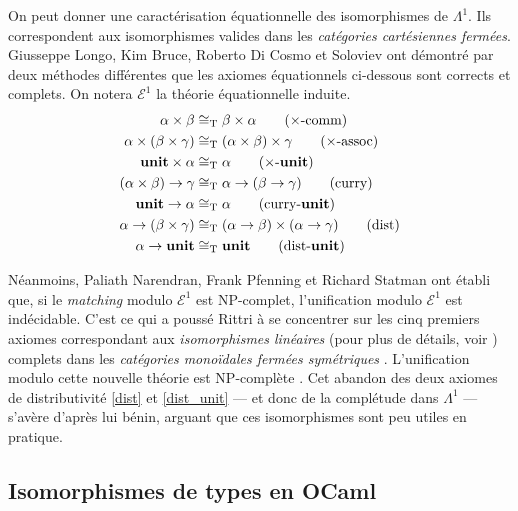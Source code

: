 \documentclass[a4paper]{report}
\theoremstyle{definition}
\newcommand{\unit}{\bold{unit}}
\newcommand{\E}{\mathscr{E}}
\newcommand{\T}{\mathrm{T}}
\begin{document}
On peut donner une caractérisation équationnelle des isomorphismes de $\Lambda^1$. Ils correspondent aux isomorphismes valides dans les \emph{catégories cartésiennes fermées}. Giusseppe Longo, Kim Bruce, Roberto Di Cosmo \cite{Bruce_DiCosmo_Longo} et Soloviev \cite{Soloviev83} ont démontré par deux méthodes différentes que les axiomes équationnels ci-dessous sont corrects et complets. On notera $\E^1$ la théorie équationnelle induite.
\begin{align}
		\alpha \times \beta &\cong_\T
		\beta \times \alpha
		\label{prod_comm}
		\tag{$\times$-comm}
	\\
		\alpha \times (\beta \times \gamma) &\cong_\T
		(\alpha \times \beta) \times \gamma
		\label{prod_assoc}
		\tag{$\times$-assoc}
	\\
		\unit \times \alpha &\cong_\T
		\alpha
		\label{prod_unit}
		\tag{$\times$-$\unit$}
	\\
		(\alpha \times \beta) \rightarrow \gamma &\cong_\T
		\alpha \rightarrow (\beta \rightarrow \gamma)
		\label{curry}
		\tag{curry}
	\\
		\unit \rightarrow \alpha &\cong_\T
		\alpha
		\label{curry_unit}
		\tag{curry-$\unit$}
	\\
		\alpha \rightarrow (\beta \times \gamma) &\cong_\T
		(\alpha \rightarrow \beta) \times (\alpha \rightarrow \gamma)
		\label{dist}
		\tag{dist}
	\\
		\alpha \rightarrow \unit &\cong_\T
		\unit
		\label{dist_unit}
		\tag{dist-$\unit$}
\end{align}

Néanmoins, Paliath Narendran, Frank Pfenning et Richard Statman \cite{Narendran_Pfenning_Statman} ont établi que, si le \emph{matching} modulo $\E^1$ est NP-complet, l'unification modulo $\E^1$ est indécidable. C'est ce qui a poussé Rittri \cite{Rittri93} à se concentrer sur les cinq premiers axiomes correspondant aux \emph{isomorphismes linéaires} (pour plus de détails, voir \cite{Rittri93}) complets dans les \emph{catégories monoïdales fermées symétriques} \cite{Soloviev93}. L'unification modulo cette nouvelle théorie est NP-complète \cite{Narendran_Pfenning_Statman}. Cet abandon des deux axiomes de distributivité \eqref{dist} et \eqref{dist_unit} — et donc de la complétude dans $\Lambda^1$ — s'avère d'après lui bénin, arguant que ces isomorphismes sont peu utiles en pratique.


\subsection{Isomorphismes de types en OCaml}
\end{document}
